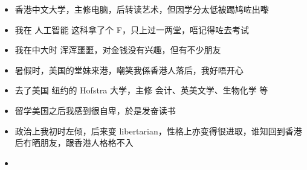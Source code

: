 \documentclass[10pt]{beamer}
\begin{document}
\begin{frame}
	\begin{itemize}
		\item 香港中文大学，主修电脑，后转读艺术，但因学分太低被踢鸠咗出嚟
		\item 我在 人工智能 这科拿了个 F，只上过一两堂，唔记得咗去考试
		\item 我在中大时 浑浑噩噩，对金钱没有兴趣，但有不少朋友
		\item 暑假时，美国的堂妹来港，嘲笑我係香港人落后，我好唔开心
		\item 去了美国 纽约的 Hofstra 大学，主修 会计、英美文学、生物化学 等
		\item 留学美国之后我感到很自卑，於是发奋读书
		\item 政治上我初时左倾，后来变 libertarian，性格上亦变得很进取，谁知回到香港后冇晒朋友，跟香港人格格不入
	\end{itemize}
\end{frame}

\begin{frame}[plain]
	\begin{itemize}
		\item 
	\end{itemize}
\end{frame}
\end{document}
